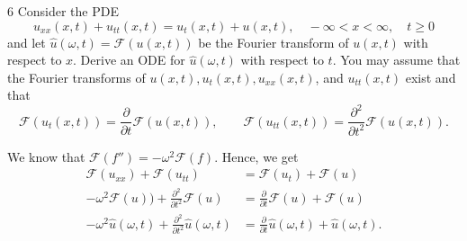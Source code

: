 

\begin{problem}{6}
  Consider the PDE
  \begin{equation*}
    u_{x x}(x,t) + u_{t t}(x,t) = u_t(x,t) + u(x,t), \quad -\infty < x < \infty, \quad t \geq 0
  \end{equation*}
  and let $\hat{u}(\omega, t) = \mathcal{F}(u(x,t))$ be the Fourier transform of $u(x,t)$ with respect to $x$.
  Derive an ODE for $\hat{u}(\omega, t)$ with respect to $t$.
  You may assume that the Fourier transforms of $u(x,t), u_t(x,t), u_{x x}(x,t)$, and $u_{t t}(x,t)$ exist and that
  \begin{equation*}
    \mathcal{F}(u_t(x,t)) = \frac{\partial }{\partial t} \mathcal{F}(u(x,t)), \qquad \mathcal{F}(u_{t t}(x,t)) = \frac{\partial ^2}{\partial t^2} \mathcal{F}(u(x,t))
  .\end{equation*}
\end{problem}

\begin{derivation}
  We know that $\mathcal{F}(f'') = - \omega^2 \mathcal{F}(f)$.
  Hence, we get
  \begin{align*}
    \mathcal{F}(u_{x x}) + \mathcal{F}(u_{t t}) &= \mathcal{F}(u_t) + \mathcal{F}(u) \\
    - \omega^2 \mathcal{F}(u)) + \frac{\partial ^2}{\partial t^2} \mathcal{F}(u) &= \frac{\partial }{\partial t} \mathcal{F}(u) + \mathcal{F}(u) \\
    - \omega^2 \hat{u}(\omega, t) + \frac{\partial ^2}{\partial t^2} \hat{u}(\omega, t) &= \frac{\partial }{\partial t} \hat{u}(\omega, t) + \hat{u}(\omega, t)
  .\end{align*}
\end{derivation}


